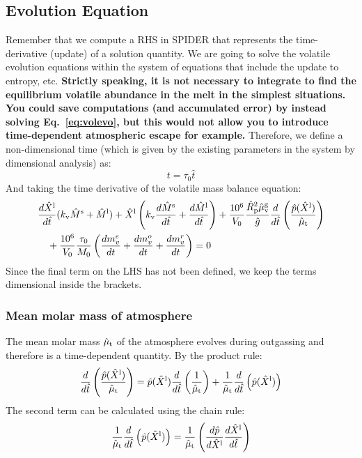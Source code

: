 \subsection{Evolution Equation}
Remember that we compute a RHS in SPIDER that represents the time-derivative (update) of a solution quantity.  We are going to solve the volatile evolution equations within the system of equations that include the update to entropy, etc.  \textbf{Strictly speaking, it is not necessary to integrate to find the equilibrium volatile abundance in the melt in the simplest situations.  You could save computations (and accumulated error) by instead solving Eq.~\ref{eq:volevo}, but this would not allow you to introduce time-dependent atmospheric escape for example.}  Therefore, we define a non-dimensional time (which is given by the existing parameters in the system by dimensional analysis) as:
\begin{equation}
t = \tau_0 \hat{t}
\end{equation}
And taking the time derivative of the volatile mass balance equation:
\begin{align}
&\frac{d \hat{X}^{\rm l}}{d \hat{t}} (k_{\rm v} \hat{M}^{\rm s} + \hat{M}^{\rm l}) + \hat{X}^{\rm l} \left( k_{\rm v} \frac{d \hat{M}^{\rm s}}{d \hat{t}} + \frac{d \hat{M}^{\rm l}}{d \hat{t}} \right) + \frac{10^6}{V_0} \frac{\hat{R}_{\rm p}^2 \hat{\mu}_{\rm v}^{\rm g}}{\hat{g}} \frac{d}{d\hat{t}} \left( \frac{\hat{p}(\hat{X}^{\rm l})}{\hat{\mu}_{\rm t}} \right)\\
&\quad + \frac{10^6}{V_0} \frac{\tau_0}{M_0} \left( \frac{dm_v^e}{dt} +  \frac{dm_v^o}{dt} + \frac{dm_v^r}{dt} \right) = 0
\end{align}
Since the final term on the LHS has not been defined, we keep the terms dimensional inside the brackets.  
\subsubsection{Mean molar mass of atmosphere}
The mean molar mass $\hat{\mu}_{\rm t}$ of the atmosphere evolves during outgassing and therefore is a time-dependent quantity.  By the product rule:
\begin{equation}
\frac{d}{d\hat{t}} \left( \frac{\hat{p}(\hat{X}^{\rm l})}{\hat{\mu}_{\rm t}} \right) = \hat{p}(\hat{X}^{\rm l}) \frac{d}{d\hat{t}} \left( \frac{1}{\hat{\mu}_{\rm t}} \right) + \frac{1}{\hat{\mu}_{\rm t}} \frac{d}{d\hat{t}} \left( \hat{p}(\hat{X}^{\rm l}) \right)
\label{eq:atmos_evo}
\end{equation}
The second term can be calculated using the chain rule:
\begin{equation}
\frac{1}{\hat{\mu}_{\rm t}} \frac{d}{d\hat{t}} \left( \hat{p}(\hat{X}^{\rm l}) \right) = \frac{1}{\hat{\mu}_{\rm t}} \left( \frac{d \hat{p}}{d \hat{X}^{\rm l}} \frac{d \hat{X}^{\rm l}}{d\hat{t}} \right)
\end{equation}
